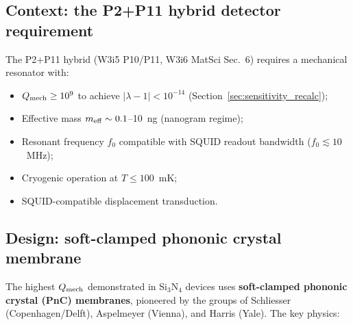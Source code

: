 \documentclass[11pt]{article}
\theoremstyle{definition}
\theoremstyle{remark}
\newcommand{\lam}{|\lambda-1|}
\newcommand{\Qmech}{Q_{\rm mech}}
\begin{document}
\subsection{Context: the P2+P11 hybrid detector requirement}

The P2+P11 hybrid (W3i5 P10/P11, W3i6 MatSci Sec.~6) requires a
mechanical resonator with:
\begin{itemize}[nosep]
  \item $\Qmech \geq 10^9$ to achieve $\lam < 10^{-14}$
    (Section~\ref{sec:sensitivity_recalc});
  \item Effective mass $m_{\rm eff} \sim 0.1$--10~ng (nanogram regime);
  \item Resonant frequency $f_0$ compatible with SQUID readout bandwidth
    ($f_0 \lesssim 10$~MHz);
  \item Cryogenic operation at $T \leq 100$~mK;
  \item SQUID-compatible displacement transduction.
\end{itemize}

\subsection{Design: soft-clamped phononic crystal membrane}
\label{sec:design}

The highest $\Qmech$ demonstrated in Si$_3$N$_4$ devices uses
\textbf{soft-clamped phononic crystal (PnC) membranes}, pioneered by
the groups of Schliesser (Copenhagen/Delft), Aspelmeyer (Vienna), and
Harris (Yale). The key physics:
\end{document}
